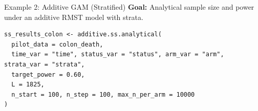 \documentclass{beamer}
\begin{document}
\begin{frame}[fragile]{Example 2: Additive GAM (Stratified)}
\textbf{Goal:} Analytical sample size and power under an additive RMST model with strata.

\begin{verbatim}
ss_results_colon <- additive.ss.analytical(
  pilot_data = colon_death,
  time_var = "time", status_var = "status", arm_var = "arm", strata_var = "strata",
  target_power = 0.60,
  L = 1825,
  n_start = 100, n_step = 100, max_n_per_arm = 10000
)
\end{verbatim}

\end{frame}
\end{document}
